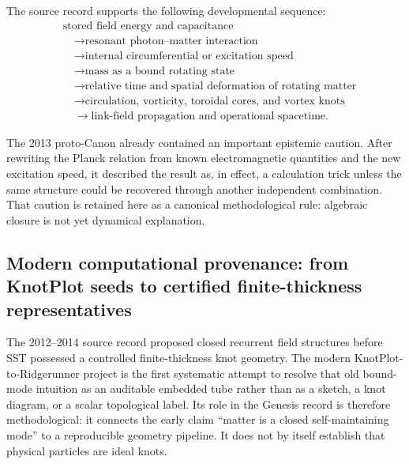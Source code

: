 \documentclass[11pt]{article}
\theoremstyle{definition}
\theoremstyle{plain}
\theoremstyle{remark}
\begin{document}
The source record supports the following developmental sequence:
\begin{align}
    &\text{stored field energy and capacitance}
    \nonumber\\[-0.2em]
    &\quad\longrightarrow
    \text{resonant photon--matter interaction}
    \nonumber\\[-0.2em]
    &\quad\longrightarrow
    \text{internal circumferential or excitation speed}
    \nonumber\\[-0.2em]
    &\quad\longrightarrow
    \text{mass as a bound rotating state}
    \nonumber\\[-0.2em]
    &\quad\longrightarrow
    \text{relative time and spatial deformation of rotating matter}
    \nonumber\\[-0.2em]
    &\quad\longrightarrow
    \text{circulation, vorticity, toroidal cores, and vortex knots}
    \nonumber\\[-0.2em]
    &\quad\longrightarrow
    \text{link-field propagation and operational spacetime}.
    \label{eq:historical_sst_development_chain}
\end{align}

The 2013 proto-Canon already contained an important epistemic caution. After
rewriting the Planck relation from known electromagnetic quantities and the new
excitation speed, it described the result as, in effect, a calculation trick
unless the same structure could be recovered through another independent
combination. That caution is retained here as a canonical methodological rule:
algebraic closure is not yet dynamical explanation.

\subsection{Modern computational provenance: from KnotPlot seeds to certified finite-thickness representatives}
\label{subsec:genesis_knotplot_ridgerunner_provenance}

The 2012--2014 source record proposed closed recurrent field structures before
SST possessed a controlled finite-thickness knot geometry.  The modern
KnotPlot-to-Ridgerunner project is the first systematic attempt to resolve that
old bound-mode intuition as an auditable embedded tube rather than as a sketch,
a knot diagram, or a scalar topological label.  Its role in the Genesis record
is therefore methodological: it connects the early claim ``matter is a closed
self-maintaining mode'' to a reproducible geometry pipeline.  It does not by
itself establish that physical particles are ideal knots.
\end{document}
